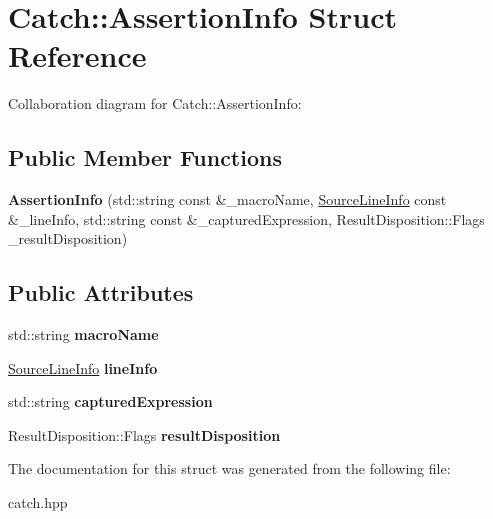 \hypertarget{structCatch_1_1AssertionInfo}{}\section{Catch\+:\+:Assertion\+Info Struct Reference}
\label{structCatch_1_1AssertionInfo}


Collaboration diagram for Catch\+:\+:Assertion\+Info\+:
\subsection*{Public Member Functions}
\begin{DoxyCompactItemize}
\item 
{\bfseries Assertion\+Info} (std\+::string const \&\+\_\+macro\+Name, \hyperlink{structCatch_1_1SourceLineInfo}{Source\+Line\+Info} const \&\+\_\+line\+Info, std\+::string const \&\+\_\+captured\+Expression, Result\+Disposition\+::\+Flags \+\_\+result\+Disposition)\hypertarget{structCatch_1_1AssertionInfo_aaf6cc3eebd40391e54d37ed42953c73f}{}\label{structCatch_1_1AssertionInfo_aaf6cc3eebd40391e54d37ed42953c73f}

\end{DoxyCompactItemize}
\subsection*{Public Attributes}
\begin{DoxyCompactItemize}
\item 
std\+::string {\bfseries macro\+Name}\hypertarget{structCatch_1_1AssertionInfo_ac2e59e8c89e00eb3390768f50d540b18}{}\label{structCatch_1_1AssertionInfo_ac2e59e8c89e00eb3390768f50d540b18}

\item 
\hyperlink{structCatch_1_1SourceLineInfo}{Source\+Line\+Info} {\bfseries line\+Info}\hypertarget{structCatch_1_1AssertionInfo_a17bdbb404ba12658034f833be2f4c3e7}{}\label{structCatch_1_1AssertionInfo_a17bdbb404ba12658034f833be2f4c3e7}

\item 
std\+::string {\bfseries captured\+Expression}\hypertarget{structCatch_1_1AssertionInfo_af7c1d3cbfa346e9a303030fa0ef0cb54}{}\label{structCatch_1_1AssertionInfo_af7c1d3cbfa346e9a303030fa0ef0cb54}

\item 
Result\+Disposition\+::\+Flags {\bfseries result\+Disposition}\hypertarget{structCatch_1_1AssertionInfo_a60353b3632ab2f827162f2b2d6911073}{}\label{structCatch_1_1AssertionInfo_a60353b3632ab2f827162f2b2d6911073}

\end{DoxyCompactItemize}


The documentation for this struct was generated from the following file\+:\begin{DoxyCompactItemize}
\item 
catch.\+hpp\end{DoxyCompactItemize}
